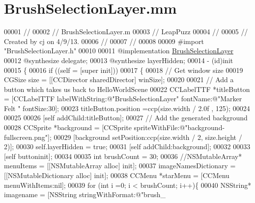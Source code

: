 \hypertarget{_brush_selection_layer_8mm}{\section{Brush\-Selection\-Layer.\-mm}
\label{d2/d04/_brush_selection_layer_8mm}
}

\begin{DoxyCode}
00001 \textcolor{comment}{//}
00002 \textcolor{comment}{//  BrushSelectionLayer.m}
00003 \textcolor{comment}{//  LeapPuzz}
00004 \textcolor{comment}{//}
00005 \textcolor{comment}{//  Created by cj on 4/9/13.}
00006 \textcolor{comment}{//}
00007 \textcolor{comment}{//}
00008 
00009 \textcolor{preprocessor}{#import "BrushSelectionLayer.h"}
00010 
00011 \textcolor{keyword}{@implementation }\hyperlink{interface_brush_selection_layer}{BrushSelectionLayer}
00012 \textcolor{keyword}{@synthesize} delegate;
00013 \textcolor{keyword}{@synthesize} layerHidden;
00014 - (id)init
00015 \{
00016     \textcolor{keywordflow}{if} ((\textcolor{keyword}{self} = [super init]))
00017     \{
00018         \textcolor{comment}{// Get window size}
00019         CGSize size = [[CCDirector sharedDirector] winSize];
00020         
00021         \textcolor{comment}{// Add a button which takes us back to HelloWorldScene}
00022         CCLabelTTF *titleButton = [CCLabelTTF labelWithString:@"BrushSelectionLayer" fontName:@"Marker Felt
      " fontSize:30];
00023         titleButton.position =ccp(size.width / 2.0f , 125);
00024         
00025         
00026         [\textcolor{keyword}{self} addChild:titleButton];
00027         \textcolor{comment}{// Add the generated background}
00028         CCSprite *background = [CCSprite spriteWithFile:@"background-fullscreen.png"];
00029         [background setPosition:ccp(size.width / 2, size.height / 2)];
00030         \textcolor{keyword}{self}.layerHidden = \textcolor{keyword}{true};
00031         [\textcolor{keyword}{self} addChild:background];
00032         
00033         [\textcolor{keyword}{self} buttoninit];
00034         
00035         \textcolor{keywordtype}{int} brushCount = 30;
00036         \textcolor{comment}{//NSMutableArray* menuItems = [[NSMutableArray alloc] init];}
00037         imageNamesDictionary = [[NSMutableDictionary alloc] init];
00038         CCMenu *starMenu = [CCMenu menuWithItems:nil];
00039         \textcolor{keywordflow}{for} (\textcolor{keywordtype}{int} i =0; i < brushCount; i++)\{
00040             NSString* imagename = [NSString stringWithFormat:@"brush\_%

\end{DoxyCode}
